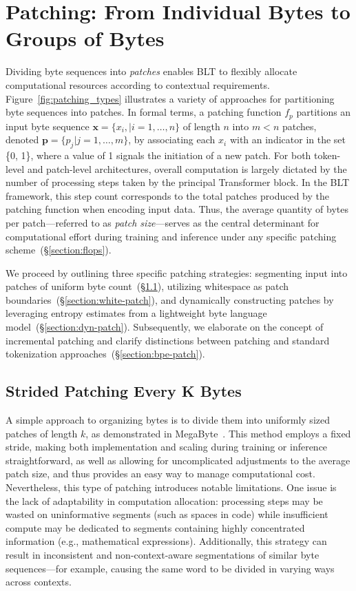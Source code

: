 \section{Patching: From Individual Bytes to Groups of Bytes}
\label{section:patching}

Dividing byte sequences into \textit{patches} enables {\textsc BLT} to flexibly allocate computational resources according to contextual requirements. Figure~\ref{fig:patching_types} illustrates a variety of approaches for partitioning byte sequences into patches. In formal terms, a patching function $f_p$ partitions an input byte sequence $\pmb{x} = \{x_i, |i=1, \ldots, n\}$ of length $n$ into $m < n$ patches, denoted $\pmb{p} = \{p_j|j=1,\ldots,m\}$, by associating each $x_i$ with an indicator in the set \{0, 1\}, where a value of 1 signals the initiation of a new patch. For both token-level and patch-level architectures, overall computation is largely dictated by the number of processing steps taken by the principal Transformer block. In the {\textsc BLT} framework, this step count corresponds to the total patches produced by the patching function when encoding input data. Thus, the average quantity of bytes per patch—referred to as \textit{patch size}—serves as the central determinant for computational effort during training and inference under any specific patching scheme~(\S\ref{section:flops}).

We proceed by outlining three specific patching strategies: segmenting input into patches of uniform byte count~(\S\ref{section:static-patch}), utilizing whitespace as patch boundaries~(\S\ref{section:white-patch}), and dynamically constructing patches by leveraging entropy estimates from a lightweight byte language model~(\S\ref{section:dyn-patch}). Subsequently, we elaborate on the concept of incremental patching and clarify distinctions between patching and standard tokenization approaches~(\S\ref{section:bpe-patch}).

\subsection{Strided Patching Every K Bytes}
\label{section:static-patch}

A simple approach to organizing bytes is to divide them into uniformly sized patches of length $k$, as demonstrated in MegaByte~\citep{yu2023megabyte}. This method employs a fixed stride, making both implementation and scaling during training or inference straightforward, as well as allowing for uncomplicated adjustments to the average patch size, and thus provides an easy way to manage computational cost. Nevertheless, this type of patching introduces notable limitations. One issue is the lack of adaptability in computation allocation: processing steps may be wasted on uninformative segments (such as spaces in code) while insufficient compute may be dedicated to segments containing highly concentrated information (e.g., mathematical expressions). Additionally, this strategy can result in inconsistent and non-context-aware segmentations of similar byte sequences—for example, causing the same word to be divided in varying ways across contexts.

